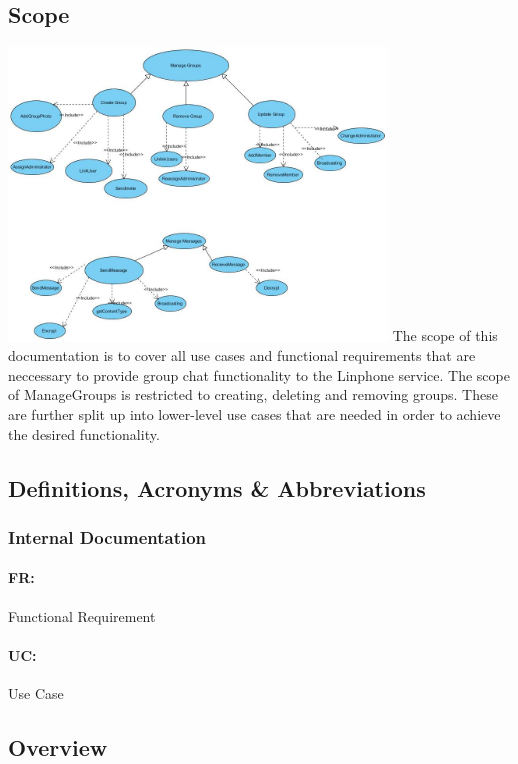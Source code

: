 \documentclass[11pt]{article}
\begin{document}
\subsection{Scope}
\includegraphics[width=380px]{./images/scope.jpg} \newline
The scope of this documentation is to cover all use cases and functional requirements that are neccessary to provide group chat functionality to the Linphone service. \newline
The scope of ManageGroups is restricted to creating, deleting and removing groups. These are further split up into lower-level use cases that are needed in order to achieve the desired functionality.\newline
\subsection{Definitions, Acronyms \& Abbreviations}
\subsubsection{Internal Documentation}
\paragraph{FR:} Functional Requirement
\paragraph{UC:} Use Case
\subsection{Overview}
\end{document}
